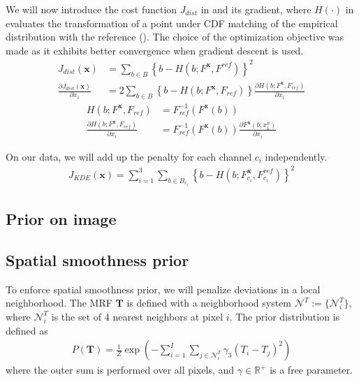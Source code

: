 We will now introduce the cost function $J_{dist}$ in  and its gradient, where $H(\cdot)$ in evaluates the transformation of a point under CDF matching of the empirical distribution with the reference (). The choice of the optimization objective was made as it exhibits better convergence when gradient descent is used.
\begin{align}
    J_{dist} (\mathbf{x}) &= \sum_{b \in B} \left\lbrace b - H \left( b; F^\mathbf{x}, F^{ref} \right) \right\rbrace^2 \label{eqn:kdecost} \\
    \frac{ \partial J_{dist} (\mathbf{x})} { \partial x_i} &= 2 \sum_{b \in B} \left\lbrace b - H \left( b; F^\mathbf{x}, F_{ref} \right) \right\rbrace \frac{\partial H \left( b; F^\mathbf{x}, F_{ref} \right)}{\partial x_i}
\end{align}
\begin{align}
    H \left( b; F^\mathbf{x}, F_{ref} \right) &= F_{ref}^{-1} \left( F^\mathbf{x} (b) \right) \label{eqn:cdfinv} \\
    \frac{\partial H \left( b; F^\mathbf{x}, F_{ref} \right)}{\partial x_i} &= F_{ref}^{-1} \left( F^\mathbf{x} (b) \right) \frac{ \partial F^\mathbf{x} (b; x_1^n)} { \partial x_i}
\end{align}

On our data, we will add up the penalty for each channel $c_i$ independently.
\begin{align}
    J_{KDE}(\mathbf{x}) = \sum_{i=1}^{3} \sum_{b \in B_{c_i}} \left\lbrace b - H \left( b; F^\mathbf{x}_{c_i}, F^{ref}_{c_i} \right) \right\rbrace^2 \label{eqn:cost_kde}
\end{align}

\subsection{Prior on image}



\subsection{Spatial smoothness prior}
To enforce spatial smoothness prior, we will penalize deviations in a local neighborhood. The MRF $\mathbf{T}$ is defined with a neighborhood system $\mathcal{N}^T := \lbrace \mathcal{N}_i^T \rbrace$, where $\mathcal{N}_i^T$ is the set of 4 nearest neighbors at pixel $i$. The prior distribution is defined as
\begin{align}
    P(\mathbf{T}) = \frac{1}{Z} \exp \left( - \sum_{i=1}^{I} \sum_{j \in \mathcal{N}_i^T} \gamma_3 (T_i - T_j)^2 \right) \label{eqn:spatialsmoothness}
\end{align}
where the outer sum is performed over all pixels, and $\gamma \in \mathbb{R}^+$ is a free parameter.

